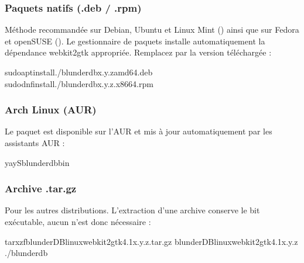 \documentclass[letterpaper,10pt,french]{sphinxmanual}
\begin{document}
\subsubsection{Paquets natifs (.deb / .rpm)}
\label{\detokenize{telecharge_install:paquets-natifs-deb-rpm}}
\sphinxAtStartPar
Méthode recommandée sur Debian, Ubuntu et Linux Mint () ainsi que sur
Fedora et openSUSE (). Le gestionnaire de paquets installe
automatiquement la dépendance webkit2gtk appropriée. Remplacez  par la
version téléchargée :

\begin{sphinxVerbatim}[commandchars=\\\{\}]
sudoaptinstall./blunderdb\PYGZus{}x.y.z\PYGZus{}amd64.deb
sudodnfinstall./blunderdb\PYGZhy{}x.y.z.x86\PYGZus{}64.rpm
\end{sphinxVerbatim}


\subsubsection{Arch Linux (AUR)}
\label{\detokenize{telecharge_install:arch-linux-aur}}
\sphinxAtStartPar
Le paquet  est disponible sur l’AUR et mis à jour
automatiquement par les assistants AUR :

\begin{sphinxVerbatim}[commandchars=\\\{\}]
yay\PYGZhy{}Sblunderdb\PYGZhy{}bin
\end{sphinxVerbatim}


\subsubsection{Archive .tar.gz}
\label{\detokenize{telecharge_install:archive-tar-gz}}
\sphinxAtStartPar
Pour les autres distributions. L’extraction d’une archive conserve le bit
exécutable, aucun  n’est donc nécessaire :

\begin{sphinxVerbatim}[commandchars=\\\{\}]
tarxzfblunderDB\PYGZhy{}linux\PYGZhy{}webkit2gtk\PYGZhy{}4.1\PYGZhy{}x.y.z.tar.gz
blunderDB\PYGZhy{}linux\PYGZhy{}webkit2gtk\PYGZhy{}4.1\PYGZhy{}x.y.z
./blunderdb
\end{sphinxVerbatim}
\end{document}
